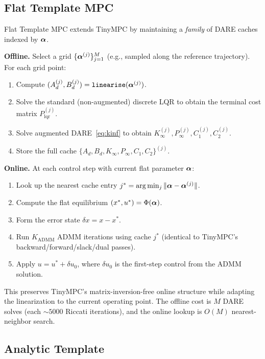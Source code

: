 \subsection{Flat Template MPC}\label{sec:flat_template}

Flat Template MPC extends TinyMPC by maintaining a \emph{family}
of DARE caches indexed by $\bm{\alpha}$.

\textbf{Offline.}
Select a grid $\{\bm{\alpha}^{(j)}\}_{j=1}^M$
(e.g., sampled along the reference trajectory).
For each grid point:
\begin{enumerate}
  \item Compute $(A_d^{(j)}, B_d^{(j)}) = \texttt{linearise}(\bm{\alpha}^{(j)})$.
  \item Solve the standard (non-augmented) discrete LQR
    to obtain the terminal cost matrix $P_{\mathrm{lqr}}^{(j)}$.
  \item Solve augmented DARE~\eqref{eq:kinf} to obtain
    $K_\infty^{(j)}, P_\infty^{(j)}, C_1^{(j)}, C_2^{(j)}$.
  \item Store the full cache
    $\{A_d, B_d, K_\infty, P_\infty, C_1, C_2\}^{(j)}$.
\end{enumerate}

\textbf{Online.}
At each control step with current flat parameter $\bm{\alpha}$:
\begin{enumerate}
  \item Look up the nearest cache entry
    $j^* = \arg\min_j \|\bm{\alpha} - \bm{\alpha}^{(j)}\|$.
  \item Compute the flat equilibrium
    $(x^*, u^*) = \Phi(\bm{\alpha})$.
  \item Form the error state $\delta x = x - x^*$.
  \item Run $K_{\mathrm{ADMM}}$ ADMM iterations using cache $j^*$
    (identical to TinyMPC's backward/forward/slack/dual passes).
  \item Apply $u = u^* + \delta u_0$, where $\delta u_0$ is
    the first-step control from the ADMM solution.
\end{enumerate}

This preserves TinyMPC's matrix-inversion-free online structure
while adapting the linearization to the current operating point.
The offline cost is $M$ DARE solves (each ${\sim}5000$ Riccati
iterations), and the online lookup is $O(M)$ nearest-neighbor search.

\subsection{Analytic Template}\label{sec:analytic}

